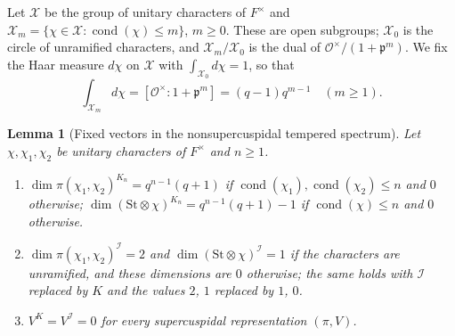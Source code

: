 \documentclass[11pt,reqno]{amsart}
\numberwithin{equation}{section}
\theoremstyle{plain}
\newtheorem{lemma}[theorem]{Lemma}
\theoremstyle{definition}
\theoremstyle{remark}
\theoremstyle{plain}
\newcommand{\OO}{\mathcal{O}}    %
\newcommand{\pp}{\mathfrak{p}}   %
\newcommand{\St}{\mathrm{St}}                   %
\newcommand{\Iw}{\mathcal{I}}                   %
\newcommand{\Xc}{\mathcal{X}}                   %
\DeclareMathOperator{\cond}{cond}   %
\begin{document}
Let $\Xc$ be the group of unitary characters of $F^\times$ and
$\Xc_m=\{\chi\in\Xc:\cond(\chi)\le m\}$, $m\ge0$. These are open
subgroups; $\Xc_0$ is the circle of unramified characters, and
$\Xc_m/\Xc_0$ is the dual of $\OO^\times/(1+\pp^m)$. We fix the
Haar measure $d\chi$ on $\Xc$ with $\int_{\Xc_0}d\chi=1$, so that
\begin{equation}\label{eq:massXm}
\int_{\Xc_m}d\chi=[\OO^\times:1+\pp^m]=(q-1)q^{m-1}\quad(m\ge1).
\end{equation}

\begin{lemma}[Fixed vectors in the nonsupercuspidal tempered spectrum]\label{lem:fixed}
Let $\chi,\chi_1,\chi_2$ be unitary characters of $F^\times$ and
$n\ge1$.
\begin{enumerate}[label=\textup{(\arabic*)},ref=\arabic*]
\item\label{item:fixed-Kn} $\dim\pi(\chi_1,\chi_2)^{K_n}=q^{n-1}(q+1)$
if $\cond(\chi_1),\cond(\chi_2)\le n$ and $0$ otherwise;
$\dim(\St\otimes\chi)^{K_n}=q^{n-1}(q+1)-1$ if $\cond(\chi)\le n$ and
$0$ otherwise.
\item\label{item:fixed-I} $\dim\pi(\chi_1,\chi_2)^{\Iw}=2$ and
$\dim(\St\otimes\chi)^{\Iw}=1$ if the characters are unramified, and
these dimensions are $0$ otherwise; the same holds with $\Iw$ replaced
by $K$ and the values $2$, $1$ replaced by $1$, $0$.
\item\label{item:fixed-sc} $V^K=V^{\Iw}=0$ for every supercuspidal representation $(\pi,V)$.
\end{enumerate}
\end{lemma}
\end{document}
